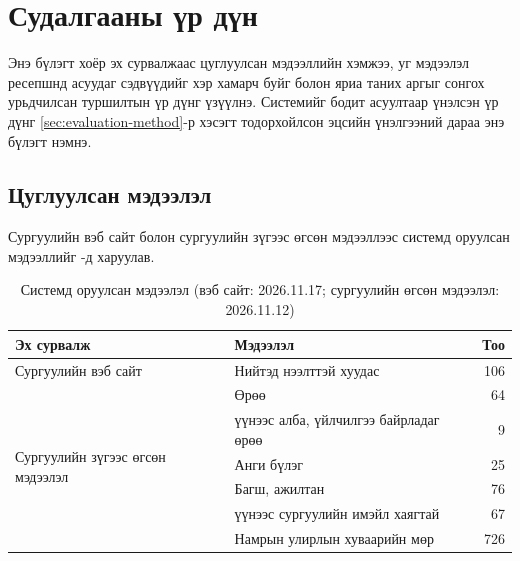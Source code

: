 \chapter{Судалгааны үр дүн}
\label{ch:results}


Энэ бүлэгт хоёр эх сурвалжаас цуглуулсан мэдээллийн хэмжээ, уг мэдээлэл ресепшнд асуудаг сэдвүүдийг хэр хамарч буйг болон яриа таних аргыг сонгох урьдчилсан туршилтын үр дүнг үзүүлнэ. Системийг бодит асуултаар үнэлсэн үр дүнг \ref{sec:evaluation-method}-р хэсэгт тодорхойлсон эцсийн үнэлгээний дараа энэ бүлэгт нэмнэ.

\section{Цуглуулсан мэдээлэл}
\label{sec:res-data}

Сургуулийн вэб сайт болон сургуулийн зүгээс өгсөн мэдээллээс системд оруулсан мэдээллийг -д харуулав.

\begin{table}[htbp]
\centering
\caption{Системд оруулсан мэдээлэл (вэб сайт: 2026.11.17; сургуулийн өгсөн мэдээлэл: 2026.11.12)}
\label{tab:collected_data}
\begin{tabular}{|p{4.6cm}|p{6.0cm}|r|}
\hline
\textbf{Эх сурвалж} & \textbf{Мэдээлэл} & \textbf{Тоо} \\
\hline
Сургуулийн вэб сайт & Нийтэд нээлттэй хуудас & 106 \\
\hline
\multirow{6}{4.6cm}{Сургуулийн зүгээс өгсөн мэдээлэл} & Өрөө & 64 \\
\cline{2-3}
 & \quad үүнээс алба, үйлчилгээ байрладаг өрөө & 9 \\
\cline{2-3}
 & Анги бүлэг & 25 \\
\cline{2-3}
 & Багш, ажилтан & 76 \\
\cline{2-3}
 & \quad үүнээс сургуулийн имэйл хаягтай & 67 \\
\cline{2-3}
 & Намрын улирлын хуваарийн мөр & 726 \\
\hline
\end{tabular}
\end{table}

